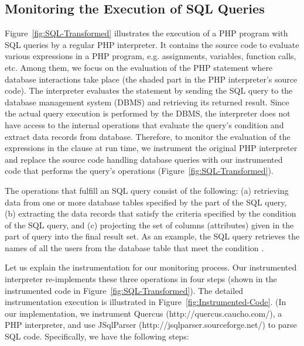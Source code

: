 \subsection{Monitoring the Execution of SQL Queries}



Figure~\ref{fig:SQL-Transformed} illustrates the execution of a PHP
program with SQL queries by a regular PHP interpreter. It contains the
source code to evaluate various expressions in a PHP program, e.g.
assignments, variables, function calls, etc. Among them, we focus on
the evaluation of the PHP
 statement where database interactions take place
(the shaded part in the PHP interpreter's source code). The
interpreter evaluates the  statement by sending the
SQL query to the database management system (DBMS) and retrieving its
returned result. Since the actual query execution is performed by the
DBMS, the interpreter does not have access to the internal operations
that evaluate the query's  condition and extract data
records from database. Therefore, to monitor the evaluation of the
expressions in the
 clause at run time, we instrument the original PHP
interpreter and replace the source code handling database queries with
our instrumented code that performs the query's operations
(Figure~\ref{fig:SQL-Transformed}).




The operations that fulfill an SQL  query consist of the
following: (a) retrieving data from one or more database tables
specified by the  part of the SQL query, (b) extracting
the data records that satisfy the criteria specified by the
 condition of the SQL query, and (c) projecting the set
of columns (attributes) given in the  part of query into
the final result set. As an example, the SQL query 
 retrieves the names of all the users from the
 database table that meet the condition .


Let us explain the instrumentation for our monitoring
process. Our instrumented interpreter re-implements these three
operations in four steps (shown in the instrumented code in
Figure~\ref{fig:SQL-Transformed}). The detailed instrumentation
execution is illustrated in Figure~\ref{fig:Instrumented-Code}. (In
our implementation, we instrument Quercus
(http://quercus.caucho.\-com/), a PHP interpreter, and use JSqlParser
(http://jsqlparser.source\-forge.\-net/) to parse SQL code. Specifically,
we have the following steps:

